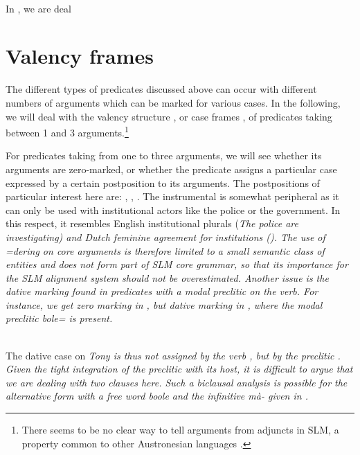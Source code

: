  \\
In , we are deal

\chapter{Valency frames}\label{sec:argstr}
The different types of predicates discussed above can occur with different numbers of arguments which can be marked for various cases. In the following, we will deal with the valency structure \citep{Bickel2004syntexp}, or case frames \citep{Tsunoda2004issues}, of predicates taking between 1 and 3 arguments.\footnote{There seems to be no clear way to tell arguments from adjuncts in SLM, a property common to other Austronesian languages \citep[158]{Himmelmann2005typochar}.}

For predicates taking from one to three arguments, we will see whether its arguments are zero-marked, or whether the predicate assigns a particular case expressed by a certain postposition to its arguments. The postpositions of particular interest here are: , , . The instrumental is somewhat peripheral as it can only be used with institutional actors like the police or the government. In this respect, it resembles English institutional plurals (\em The police are investigating\em) and Dutch feminine agreement for institutions (). The use of \em =dering \em on core arguments is therefore limited to a small semantic class of entities and does not form part of SLM core grammar, so that its importance for the SLM alignment system should not be overestimated. Another issue is the dative marking found in predicates with a modal preclitic on the verb. For instance, we get zero marking in , but dative marking in , where the modal preclitic \em bole= \em is present.


 \\
The dative case on \em Tony \em is thus not assigned by the verb , but by the preclitic . Given the tight integration of the preclitic with its host, it is difficult to argue that we are dealing with two clauses here. Such a biclausal analysis is possible for the alternative form with a free word \em boole \em and the infinitive \em mà- \em given in .



